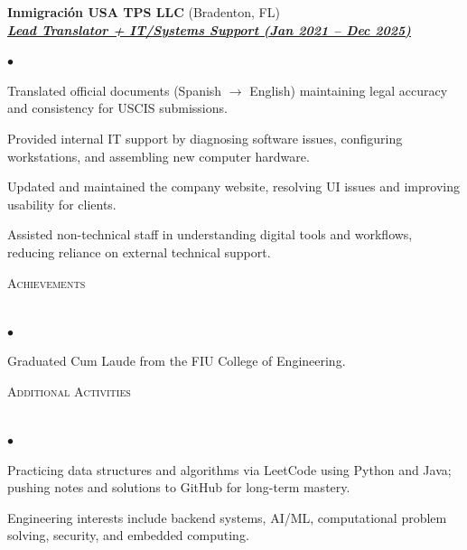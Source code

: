 \documentclass[a4paper]{article}
\newcommand{\lineunder}{
    \vspace*{-8pt}\\
    \hspace*{-18pt}\hrulefill\\
}
\newcommand{\header}[1]{
    {\hspace*{-18pt}\vspace*{6pt} \textsc{#1}}
    \vspace*{-6pt}\lineunder
}
\newcommand{\employer}[3]{
    {\textbf{#1} (#2)\\ \underline{\textbf{\emph{#3}}}\\}
}
\newenvironment{achievements}{
    \begin{list}
        {$\bullet$}{\topsep 0pt \itemsep -2pt}
    }{
        \vspace*{4pt}
    \end{list}
}
\begin{document}
\employer{Inmigraci\'on USA TPS LLC}{Bradenton, FL}{Lead Translator + IT/Systems Support (Jan 2021 -- Dec 2025)}
\begin{achievements}
    \item Translated official documents (Spanish $\rightarrow$ English) maintaining legal accuracy and consistency for USCIS submissions.
    \item Provided internal IT support by diagnosing software issues, configuring workstations, and assembling new computer hardware.
    \item Updated and maintained the company website, resolving UI issues and improving usability for clients.
    \item Assisted non-technical staff in understanding digital tools and workflows, reducing reliance on external technical support.
\end{achievements}

\header{Achievements}
\begin{achievements}
    \item Graduated Cum Laude from the FIU College of Engineering.
\end{achievements}

\header{Additional Activities}
\begin{achievements}
    \item Practicing data structures and algorithms via LeetCode using Python and Java; pushing notes and solutions to GitHub for long-term mastery.
    \item Engineering interests include backend systems, AI/ML, computational problem solving, security, and embedded computing.
\end{achievements}
\end{document}
